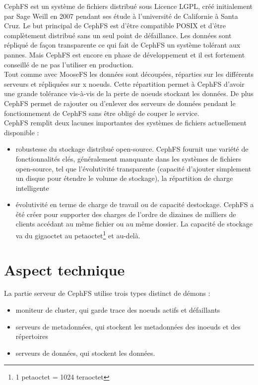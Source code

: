 \documentclass[12pt]{report}
\begin{document}
                        CephFS est un système de fichiers distribué sous Licence LGPL, créé initialement par Sage Weill en 2007 pendant ses étude à l'université de Californie à Santa Cruz. Le but principal de CephFS est d'être compatible POSIX et d'être complètement distribué sans un seul point de défaillance. Les données sont répliqué de façon transparente ce qui fait de CephFS un système tolérant aux pannes. Mais CephFS est encore en phase de développement et il est fortement conseillé de ne pas l'utiliser en production.\\

                        Tout comme avec MooseFS les données sont découpées, réparties sur les différents serveurs et répliquées sur x noeuds. Cette répartition permet à CephFS d'avoir une grande tolérance vis-à-vis de la perte de noeuds stockant les données. De plus CephFS permet de rajouter ou d'enlever des serveurs de données pendant le fonctionnement de CephFS sans être obligé de couper le service.\\

                        CephFS remplit deux lacunes importantes des systèmes de fichiers actuellement disponible :
                        \begin{itemize}
                          \item robustesse du stockage distribué open-source. CephFS fournit une variété de fonctionnalités clés, généralement manquante dans les systèmes de fichiers open-source, tel que l'évolutivité transparente (capacité d'ajouter simplement un disque pour étendre le volume de stockage), la répartition de charge intelligente
                          \item évolutivité en terme de charge de travail ou de capacité destockage. CephFS a été créer pour supporter des charges de l'ordre de dizaines de milliers de clients accédant au même fichier ou au même dossier. La capacité de stockage va du gigaoctet au petaoctet\footnote{1 petaoctet = 1024 teraoctet} et au-delà.
                        \end{itemize}
                        
                \section{Aspect technique}
                        
                        La partie serveur de CephFS utilise trois types distinct de démons : 
                        \begin{itemize}
                        \item moniteur de cluster, qui garde trace des noeuds actifs et défaillants
                          \item serveurs de metadonnées, qui stockent les metadonnées des inoeuds et des répertoires
                          \item serveurs de données, qui stockent les données.
                        \end{itemize}
\end{document}

